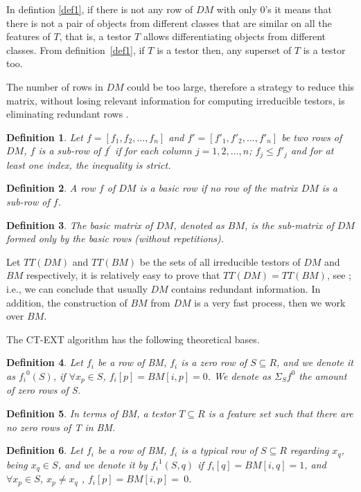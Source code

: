 \documentclass[authoryear,preprint,review,12pt]{elsarticle}
\newtheorem{definition}{Definition}
\begin{document}
In defintion \ref{def1}, if there is not any row of $DM$ with only
0's it means that there is not a pair of objects from different
classes that are similar on all the features of $T$, that is, a
testor $T$ allows differentiating objects from different
classes. From definition~\ref{def1}, if $T$ is a testor then, any superset of $T$ is a testor too.

The number of rows in $DM$ could be too large, therefore a strategy to reduce this matrix, without losing
relevant information for computing irreducible testors, is eliminating redundant rows \citep{R1}.

\begin{definition}
Let $f=[f_1, f_2, \dots , f_n]$ and $f'=[f'_1, {f'}_2, \dots , {f'}_n]$ be two rows of $DM$, $f$ 
is a sub-row of $f^{'}$ if for each column $j=1,2,\dots ,n$;  $f_{j} \le f'_{j}$ and for at least one index, the 
inequality is strict.
\end{definition}

\begin{definition}
A row $f$ of $DM$ is a basic row if no row of the matrix $DM$ is a sub-row of $f$. 
\end{definition}

\begin{definition}
The basic matrix of $DM$, denoted as $BM$, is the sub-matrix of $DM$ formed only by the basic rows (without 
repetitions).

\end{definition}

Let $TT(DM)$ and $TT(BM)$ be the sets of all irreducible testors of $DM$ and $BM$ respectively, it is 
relatively easy to prove that $TT(DM)=TT(BM)$, see \citep{R32}; i.e., we can conclude that usually $DM$ 
contains redundant information. In addition, the construction of $BM$ from $DM$ is a very fast process, 
then we work over $BM$.

The CT-EXT algorithm has the following theoretical bases.
\begin{definition} \label{def21} Let $f_i$ be a row of BM, $f_i$ is a zero row of $S \subseteq R$, and we denote it as ${f_i}^0 (S)$, if $\forall x_p \in S$, $f_i [p] = BM [i, p] = 0$. We denote as $\Sigma_S f^0$  the amount of zero rows of S.
\end{definition}
\begin{definition} \label{def22} In terms of BM, a testor $T \subseteq R$ is a feature set such that there
are no zero rows of T in BM. 
\end{definition}
\begin{definition} \label{def23} Let $f_i$ be a row of BM, $f_i$ is a typical row of $S \subseteq R$ regarding $x_q$, being $x_q \in S$, and we denote it by ${f_i}^1 (S,q)$ if $f_i [q] = BM [i, q] = 1$, and $\forall x_p \in S$, $x_p \neq x_q$ , $f_i [p] = BM [i, p] =~0$.
\end{definition}
\end{document}
